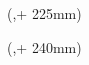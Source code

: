 \begin{textblock*}{\seitenbreite}(\bindekorrektur,\seitenanfang + 225mm)
  \centering\large
  \textsf{\hsmafirmatext\,\hsmafirma}
\end{textblock*}

\begin{textblock*}{\seitenbreite}(\bindekorrektur,\seitenanfang + 240mm)
  \centering\large\sffamily
  \hsmatutor \\
  \vspace{2mm}
  \hsmabetreuer\\
  \vspace{2mm}
  \hsmazweitkorrektor
\end{textblock*}








